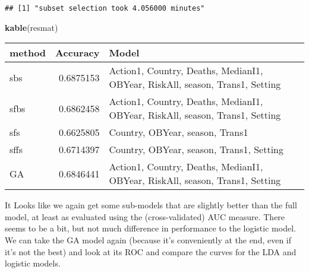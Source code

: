 \documentclass[]{article}
\newenvironment{Shaded}{\begin{snugshade}}{\end{snugshade}}
\newcommand{\CommentTok}[1]{\textcolor[rgb]{0.56,0.35,0.01}{\textit{#1}}}
\newcommand{\DataTypeTok}[1]{\textcolor[rgb]{0.13,0.29,0.53}{#1}}
\newcommand{\DecValTok}[1]{\textcolor[rgb]{0.00,0.00,0.81}{#1}}
\newcommand{\KeywordTok}[1]{\textcolor[rgb]{0.13,0.29,0.53}{\textbf{#1}}}
\newcommand{\NormalTok}[1]{#1}
\newcommand{\OperatorTok}[1]{\textcolor[rgb]{0.81,0.36,0.00}{\textbf{#1}}}
\newcommand{\StringTok}[1]{\textcolor[rgb]{0.31,0.60,0.02}{#1}}
\begin{document}
\begin{verbatim}
## [1] "subset selection took 4.056000 minutes"
\end{verbatim}

\begin{Shaded}
\begin{Highlighting}[]
\KeywordTok{kable}\NormalTok{(resmat)}
\end{Highlighting}
\end{Shaded}

\begin{longtable}[]{@{}lrl@{}}
\toprule
method & Accuracy & Model\tabularnewline
\midrule
\endhead
sbs & 0.6875153 & Action1, Country, Deaths, MedianI1, OBYear, RiskAll,
season, Trans1, Setting\tabularnewline
sfbs & 0.6862458 & Action1, Country, Deaths, MedianI1, OBYear, RiskAll,
season, Trans1, Setting\tabularnewline
sfs & 0.6625805 & Country, OBYear, season, Trans1\tabularnewline
sffs & 0.6714397 & Country, OBYear, season, Trans1,
Setting\tabularnewline
GA & 0.6846441 & Action1, Country, Deaths, MedianI1, OBYear, RiskAll,
season, Trans1, Setting\tabularnewline
\bottomrule
\end{longtable}

It Looks like we again get some sub-models that are slightly better than
the full model, at least as evaluated using the (cross-validated) AUC
measure. There seems to be a bit, but not much difference in performance
to the logistic model. We can take the GA model again (because it's
conveniently at the end, even if it's not the best) and look at its ROC
and compare the curves for the LDA and logistic models.

\begin{Shaded}
\end{Shaded}
\end{document}
